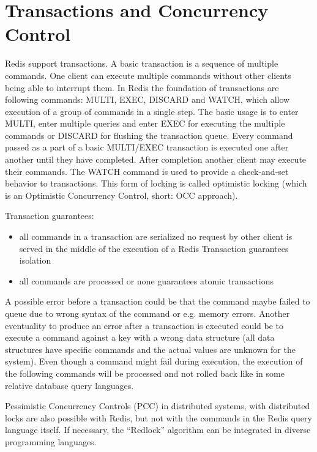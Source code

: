 \chapter{Transactions and Concurrency Control}

Redis support transactions. A basic transaction is a sequence of multiple commands. One client can execute multiple commands without other clients being able to interrupt them. In Redis the foundation of transactions are following commands: MULTI, EXEC, DISCARD and WATCH, which allow execution of a group of commands in a single step. The basic usage is to enter MULTI, enter multiple queries and enter EXEC for executing the multiple commands or  DISCARD for flushing the transaction queue. Every command passed as a part of a basic MULTI/EXEC transaction is executed one after another until they have completed. After completion another client may execute their commands. The WATCH command is used to provide a check-and-set behavior to transactions. This form of locking is called optimistic locking (which is an Optimistic Concurrency Control, short: OCC approach).

Transaction guarantees:
\begin{itemize}
\item all commands in a transaction are serialized no request by other client is served in the middle of the execution of a Redis Transaction guarantees isolation
\item all commands are processed or none guarantees atomic transactions 
\end{itemize}

A possible error before a transaction could be that the command maybe failed to queue due to wrong syntax of the command or e.g. memory errors. Another eventuality to produce an error after a transaction is executed could be to execute a command against a key with a wrong data structure (all data structures have specific commands and the actual values are unknown for the system). Even though a command might fail during execution, the execution of the following commands will be processed and not rolled back like in some relative database query languages.

Pessimistic Concurrency Controls (PCC) in distributed systems, with distributed locks are also possible with Redis, but not with the commands in the Redis query language itself. If necessary, the “Redlock” algorithm can be integrated in diverse programming languages.
